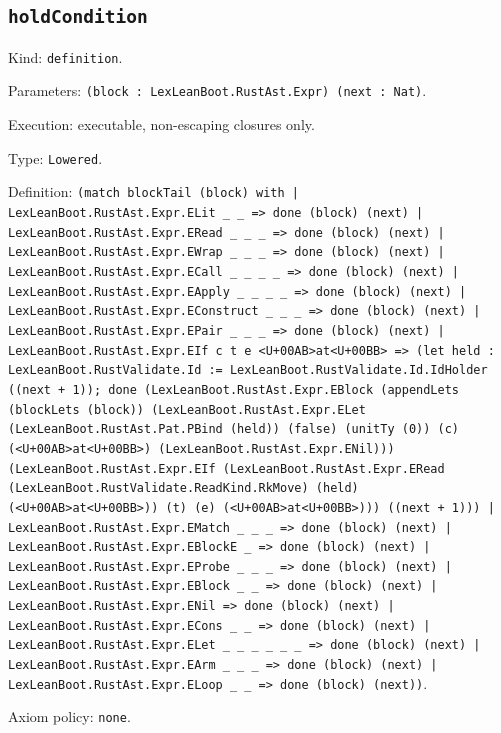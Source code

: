 \documentclass[11pt]{article}
\begin{document}
\subsection*{\texttt{holdCondition}}
\noindent Kind: \texttt{definition}.\par
\noindent Parameters: \texttt{(block : LexLeanBoot.RustAst.Expr) (next : Nat)}.\par
\noindent Execution: executable, non-escaping closures only.\par
\noindent Type: \texttt{Lowered}.\par
\noindent Definition: \texttt{(match blockTail (block) with | LexLeanBoot.RustAst.Expr.ELit \_ \_ => done (block) (next) | LexLeanBoot.RustAst.Expr.ERead \_ \_ \_ => done (block) (next) | LexLeanBoot.RustAst.Expr.EWrap \_ \_ \_ => done (block) (next) | LexLeanBoot.RustAst.Expr.ECall \_ \_ \_ \_ => done (block) (next) | LexLeanBoot.RustAst.Expr.EApply \_ \_ \_ \_ => done (block) (next) | LexLeanBoot.RustAst.Expr.EConstruct \_ \_ \_ => done (block) (next) | LexLeanBoot.RustAst.Expr.EPair \_ \_ \_ => done (block) (next) | LexLeanBoot.RustAst.Expr.EIf c t e <U+00AB>at<U+00BB> => (let held : LexLeanBoot.RustValidate.Id := LexLeanBoot.RustValidate.Id.IdHolder ((next + 1)); done (LexLeanBoot.RustAst.Expr.EBlock (appendLets (blockLets (block)) (LexLeanBoot.RustAst.Expr.ELet (LexLeanBoot.RustAst.Pat.PBind (held)) (false) (unitTy (0)) (c) (<U+00AB>at<U+00BB>) (LexLeanBoot.RustAst.Expr.ENil))) (LexLeanBoot.RustAst.Expr.EIf (LexLeanBoot.RustAst.Expr.ERead (LexLeanBoot.RustValidate.ReadKind.RkMove) (held) (<U+00AB>at<U+00BB>)) (t) (e) (<U+00AB>at<U+00BB>))) ((next + 1))) | LexLeanBoot.RustAst.Expr.EMatch \_ \_ \_ => done (block) (next) | LexLeanBoot.RustAst.Expr.EBlockE \_ => done (block) (next) | LexLeanBoot.RustAst.Expr.EProbe \_ \_ \_ => done (block) (next) | LexLeanBoot.RustAst.Expr.EBlock \_ \_ => done (block) (next) | LexLeanBoot.RustAst.Expr.ENil => done (block) (next) | LexLeanBoot.RustAst.Expr.ECons \_ \_ => done (block) (next) | LexLeanBoot.RustAst.Expr.ELet \_ \_ \_ \_ \_ \_ => done (block) (next) | LexLeanBoot.RustAst.Expr.EArm \_ \_ \_ => done (block) (next) | LexLeanBoot.RustAst.Expr.ELoop \_ \_ => done (block) (next))}.\par
\noindent Axiom policy: \texttt{none}.\par
\end{document}

